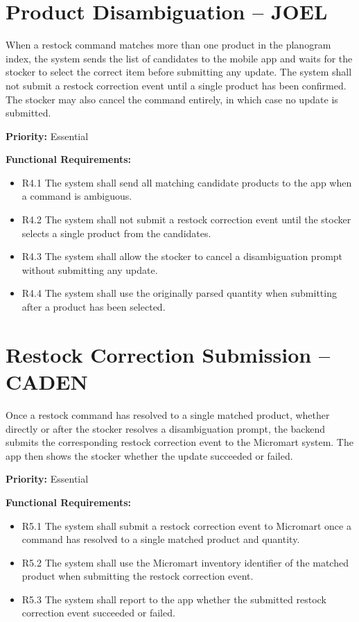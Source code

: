\documentclass{scrreprt}
\begin{document}
\section{Product Disambiguation -- JOEL}
When a restock command matches more than one product in the planogram 
index, the system sends the list of candidates to the mobile app and 
waits for the stocker to select the correct item before submitting any 
update. The system shall not submit a restock correction event until a 
single product has been confirmed. The stocker may also cancel the 
command entirely, in which case no update is submitted.

\textbf{Priority:} Essential

\textbf{Functional Requirements:}
\begin{itemize}
    \item R4.1 The system shall send all matching candidate products to 
    the app when a command is ambiguous.
    \item R4.2 The system shall not submit a restock correction event until 
    the stocker selects a single product from the candidates.
    \item R4.3 The system shall allow the stocker to cancel a disambiguation 
    prompt without submitting any update.
    \item R4.4 The system shall use the originally parsed quantity when 
    submitting after a product has been selected.
\end{itemize}

\section{Restock Correction Submission -- CADEN}
Once a restock command has resolved to a single matched product, whether directly or after the stocker resolves a disambiguation prompt, the backend submits the corresponding restock correction event to the Micromart system. The app then shows the stocker whether the update succeeded or failed.

\textbf{Priority:} Essential

\textbf{Functional Requirements:}
\begin{itemize}
    \item R5.1 The system shall submit a restock correction event to Micromart once a command has resolved to a single matched product and quantity.
    \item R5.2 The system shall use the Micromart inventory identifier of the matched product when submitting the restock correction event.
    \item R5.3 The system shall report to the app whether the submitted restock correction event succeeded or failed.
\end{itemize}
\end{document}
